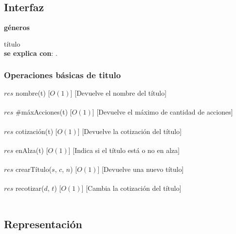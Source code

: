 \subsection{Interfaz}


   \parbox{1.7cm}{\textbf{g\'eneros}} t\'itulo\\
    
  \textbf{se explica con}: .


  \subsubsection{Operaciones b\'asicas de titulo}

  {$res$ \igobs nombre(t)}
  [$O(1)$]
  [Devuelve el nombre del t\'itulo]\\\\

  {$res$ \igobs $\#$m\'axAcciones(t)}
  [$O(1)$]
  [Devuelve el m\'aximo de cantidad de acciones]\\\\

  {$res$ \igobs cotizaci\'on(t)}
  [$O(1)$]
  [Devuelve la cotizaci\'on del t\'itulo]\\\\

  {$res$ \igobs enAlza(t)}
  [$O(1)$]
  [Indica si el t\'itulo est\'a o no en alza]\\\\

  {$res$ \igobs crearT\'itulo($s$, $c$, $n$)}
  [$O(1)$]
  [Devuelve una nuevo t\'itulo]\\\\

  {$res$ \igobs recotizar($d$, $t$)}
  [$O(1)$]
  [Cambia la cotizaci\'on del t\'itulo]\\\\


\subsection{Representaci\'on}
